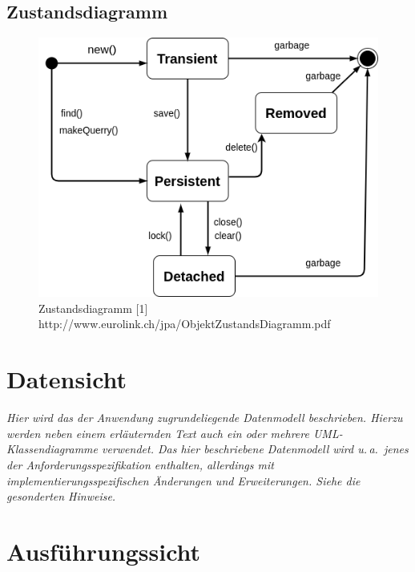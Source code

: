 \documentclass[fontsize=12pt,paper=a4,twoside]{scrartcl}
\begin{document}
\subsection{Zustandsdiagramm}
\begin{figure}[htp]
	\centering
	\includegraphics[width=0.9\linewidth]{pics/Zustandsdiagramm.png}
	\caption{Zustandsdiagramm [1] http://www.eurolink.ch/jpa/ObjektZustandsDiagramm.pdf}
	\label{fig4}
	
\end{figure}

\section{Datensicht} \label{sec:datensicht}

{\itshape Hier wird das der Anwendung zugrundeliegende Datenmodell beschrieben. 
Hierzu werden neben einem erläuternden Text auch ein oder mehrere 
{UML}-Klassendiagramme verwendet. Das hier beschriebene Datenmodell wird u.\,a.\ 
jenes der Anforderungsspezifikation enthalten, allerdings mit 
implementierungsspezifischen Änderungen und Erweiterungen. Siehe die gesonderten
Hinweise.}


\section{Ausführungssicht} \label{sec:ausfuehrung}
\end{document}
